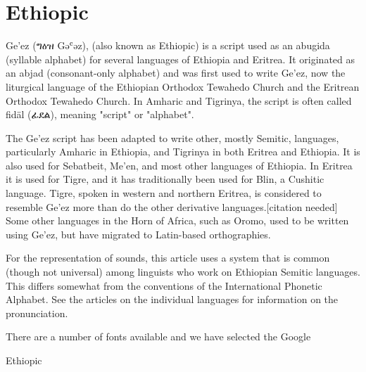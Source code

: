 
\newfontfamily{}

\section{Ethiopic}
\label{s:ethiopic}

Ge'ez ({\ethiopic ግዕዝ} Gəʿəz), (also known as Ethiopic) is a script used as an abugida (syllable alphabet) for several languages of Ethiopia and Eritrea. It originated as an abjad (consonant-only alphabet) and was first used to write Ge'ez, now the liturgical language of the Ethiopian Orthodox Tewahedo Church and the Eritrean Orthodox Tewahedo Church. In Amharic and Tigrinya, the script is often called fidäl ({\ethiopic ፊደል}), meaning "script" or "alphabet".

The Ge'ez script has been adapted to write other, mostly Semitic, languages, particularly Amharic in Ethiopia, and Tigrinya in both Eritrea and Ethiopia. It is also used for Sebatbeit, Me'en, and most other languages of Ethiopia. In Eritrea it is used for Tigre, and it has traditionally been used for Blin, a Cushitic language. Tigre, spoken in western and northern Eritrea, is considered to resemble Ge'ez more than do the other derivative languages.[citation needed] Some other languages in the Horn of Africa, such as Oromo, used to be written using Ge'ez, but have migrated to Latin-based orthographies.

For the representation of sounds, this article uses a system that is common (though not universal) among linguists who work on Ethiopian Semitic languages. This differs somewhat from the conventions of the International Phonetic Alphabet. See the articles on the individual languages for information on the pronunciation.

There are a number of fonts available and we have selected the Google 


\begin{scriptexample}[]{Ethiopic}
\end{scriptexample}





